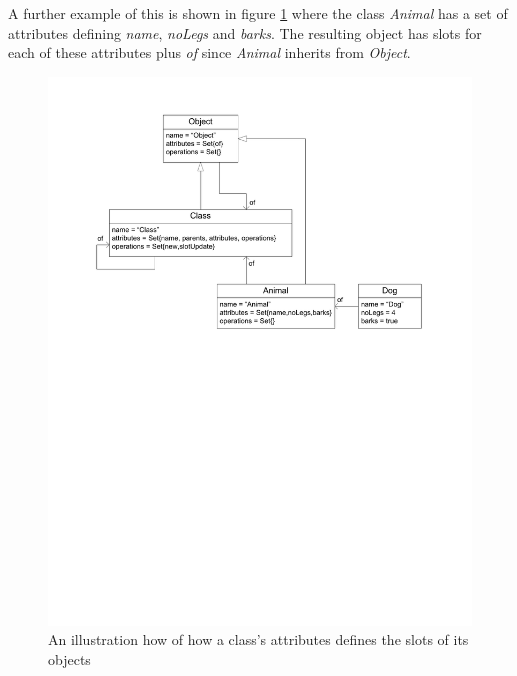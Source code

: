 \noindent A further example of this is shown in figure \ref{moreDetailExample2} where the class \emph{Animal} has a set of attributes defining \emph{name}, \emph{noLegs} and \emph{barks}.  The resulting object has slots for each of these attributes plus \emph{of} since \emph{Animal} inherits from \emph{Object}.


\begin{figure}
\begin{center}
\includegraphics[width=12cm]{MetaToolArchitecture/figures/moreDetailExample2.pdf}
\caption{An illustration how of how a class's attributes defines the slots of its objects}
\label{moreDetailExample2}
\end{center}
\end{figure}

